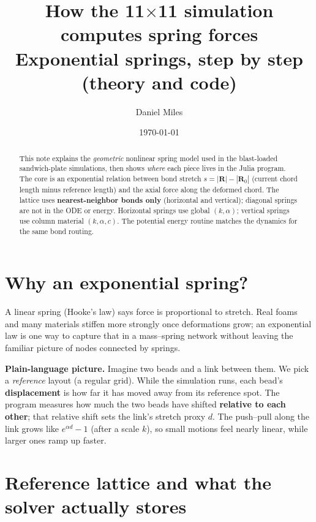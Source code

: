 \documentclass[11pt,a4paper]{article}
\title{\textbf{How the 11$\times$11 simulation computes spring forces}\\[0.35em]
\large Exponential springs, step by step (theory and code)}
\author{Daniel Miles}
\date{\today}
\begin{document}
\maketitle

\begin{abstract}
\noindent
This note explains the \emph{geometric} nonlinear spring model used in the blast-loaded sandwich-plate simulations, then shows \emph{where} each piece lives in the Julia program. The core is an exponential relation between bond stretch $s=|\mathbf{R}|-|\mathbf{R}_0|$ (current chord length minus reference length) and the axial force along the deformed chord. The lattice uses \textbf{nearest-neighbor bonds only} (horizontal and vertical); diagonal springs are not in the ODE or energy. Horizontal springs use global $(k,\alpha)$; vertical springs use column material $(k,\alpha,c)$. The potential energy routine matches the dynamics for the same bond routing.
\end{abstract}

\section{Why an exponential spring?}
\label{sec:why}

A linear spring (Hooke's law) says force is proportional to stretch. Real foams and many materials stiffen more strongly once deformations grow; an exponential law is one way to capture that in a mass--spring network without leaving the familiar picture of nodes connected by springs.

\medskip
\noindent\textbf{Plain-language picture.} Imagine two beads and a link between them. We pick a \emph{reference} layout (a regular grid). While the simulation runs, each bead's \textbf{displacement} is how far it has moved away from its reference spot. The program measures how much the two beads have shifted \textbf{relative to each other}; that relative shift sets the link's stretch proxy $d$. The push--pull along the link grows like $e^{\alpha d}-1$ (after a scale $k$), so small motions feel nearly linear, while larger ones ramp up faster.

\section{Reference lattice and what the solver actually stores}
\label{sec:kinematics}
\end{document}
